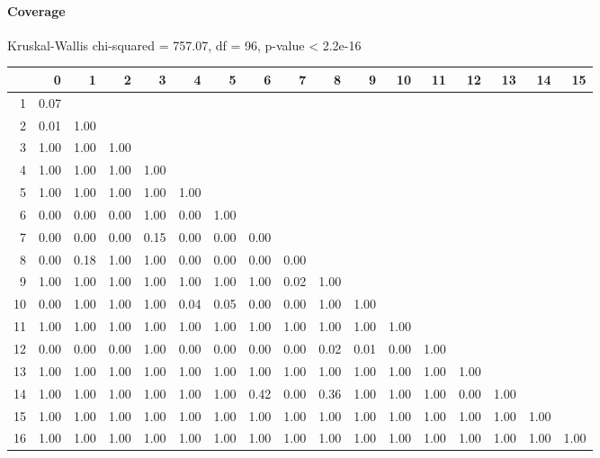 \paragraph{Coverage}
Kruskal-Wallis chi-squared = 757.07, df = 96, p-value < 2.2e-16

% 
\begin{tabular}{rrrrrrrrrrrrrrrrr}
  \hline
 & 0 & 1 & 2 & 3 & 4 & 5 & 6 & 7 & 8 & 9 & 10 & 11 & 12 & 13 & 14 & 15 \\ 
  \hline
1 & 0.07 &  &  &  &  &  &  &  &  &  &  &  &  &  &  &  \\ 
  2 & 0.01 & 1.00 &  &  &  &  &  &  &  &  &  &  &  &  &  &  \\ 
  3 & 1.00 & 1.00 & 1.00 &  &  &  &  &  &  &  &  &  &  &  &  &  \\ 
  4 & 1.00 & 1.00 & 1.00 & 1.00 &  &  &  &  &  &  &  &  &  &  &  &  \\ 
  5 & 1.00 & 1.00 & 1.00 & 1.00 & 1.00 &  &  &  &  &  &  &  &  &  &  &  \\ 
  6 & 0.00 & 0.00 & 0.00 & 1.00 & 0.00 & 1.00 &  &  &  &  &  &  &  &  &  &  \\ 
  7 & 0.00 & 0.00 & 0.00 & 0.15 & 0.00 & 0.00 & 0.00 &  &  &  &  &  &  &  &  &  \\ 
  8 & 0.00 & 0.18 & 1.00 & 1.00 & 0.00 & 0.00 & 0.00 & 0.00 &  &  &  &  &  &  &  &  \\ 
  9 & 1.00 & 1.00 & 1.00 & 1.00 & 1.00 & 1.00 & 1.00 & 0.02 & 1.00 &  &  &  &  &  &  &  \\ 
  10 & 0.00 & 1.00 & 1.00 & 1.00 & 0.04 & 0.05 & 0.00 & 0.00 & 1.00 & 1.00 &  &  &  &  &  &  \\ 
  11 & 1.00 & 1.00 & 1.00 & 1.00 & 1.00 & 1.00 & 1.00 & 1.00 & 1.00 & 1.00 & 1.00 &  &  &  &  &  \\ 
  12 & 0.00 & 0.00 & 0.00 & 1.00 & 0.00 & 0.00 & 0.00 & 0.00 & 0.02 & 0.01 & 0.00 & 1.00 &  &  &  &  \\ 
  13 & 1.00 & 1.00 & 1.00 & 1.00 & 1.00 & 1.00 & 1.00 & 1.00 & 1.00 & 1.00 & 1.00 & 1.00 & 1.00 &  &  &  \\ 
  14 & 1.00 & 1.00 & 1.00 & 1.00 & 1.00 & 1.00 & 0.42 & 0.00 & 0.36 & 1.00 & 1.00 & 1.00 & 0.00 & 1.00 &  &  \\ 
  15 & 1.00 & 1.00 & 1.00 & 1.00 & 1.00 & 1.00 & 1.00 & 1.00 & 1.00 & 1.00 & 1.00 & 1.00 & 1.00 & 1.00 & 1.00 &  \\ 
  16 & 1.00 & 1.00 & 1.00 & 1.00 & 1.00 & 1.00 & 1.00 & 1.00 & 1.00 & 1.00 & 1.00 & 1.00 & 1.00 & 1.00 & 1.00 & 1.00 \\ 
   \hline
\end{tabular}
